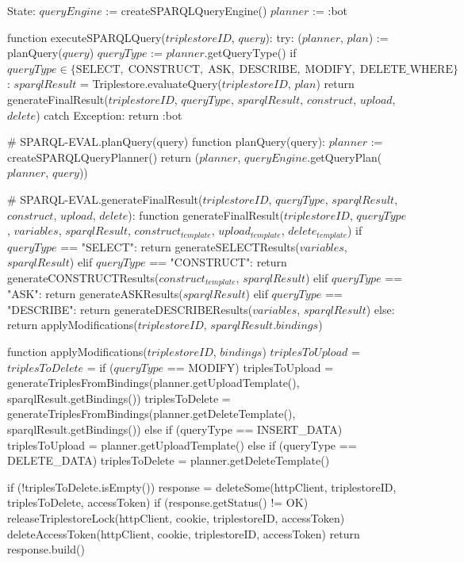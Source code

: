 State:
    $queryEngine$ := createSPARQLQueryEngine()
    $planner$ := :bot

function executeSPARQLQuery($triplestoreID$, $query$):
    try:
        ($planner$, $plan$) := planQuery($query$) 
        $queryType$ := $planner$.getQueryType()
        if $queryType \in \{ \textrm{SELECT}, \; \textrm{CONSTRUCT}, \; \textrm{ASK}, \; \textrm{DESCRIBE}, \; \textrm{MODIFY}, \; \textrm{DELETE_WHERE} \}$:
            $sparqlResult$ = Triplestore.evaluateQuery($triplestoreID$, $plan$)
        return generateFinalResult($triplestoreID$, $queryType$, $sparqlResult$, $construct$, $upload$, $delete$)
    catch Exception:
        return :bot

# SPARQL-EVAL.planQuery(query)
function planQuery(query):
    $planner$ := createSPARQLQueryPlanner()
    return ($planner$, $queryEngine$.getQueryPlan($planner$, $query$))


# SPARQL-EVAL.generateFinalResult($triplestoreID$, $queryType$, $sparqlResult$, $construct$, $upload$, $delete$):
function generateFinalResult($triplestoreID$, $queryType$, $variables$, $sparqlResult$, $construct_{template}$, $upload_{template}$, $delete_{template}$)
    if $queryType$ == "SELECT":
        return generateSELECTResults($variables$, $sparqlResult$)
    elif $queryType$ == "CONSTRUCT":
        return generateCONSTRUCTResults($construct_{template}$, $sparqlResult$)
    elif $queryType$ == "ASK":
        return generateASKResults($sparqlResult$)
    elif $queryType$ == "DESCRIBE":
        return generateDESCRIBEResults($variables$, $sparqlResult$)
    else:
        return applyModifications($triplestoreID$, $sparqlResult$.$bindings$)
    

function applyModifications($triplestoreID$, $bindings$) 
    $triplesToUpload$ = {}
    $triplesToDelete$ = {}
    if ($queryType$ == MODIFY)
        triplesToUpload = generateTriplesFromBindings(planner.getUploadTemplate(), sparqlResult.getBindings())
    triplesToDelete = generateTriplesFromBindings(planner.getDeleteTemplate(), sparqlResult.getBindings())
    else if (queryType == INSERT_DATA)
        triplesToUpload = planner.getUploadTemplate()
    else if (queryType == DELETE_DATA)
        triplesToDelete = planner.getDeleteTemplate()

    if (!triplesToDelete.isEmpty()) 
        response = deleteSome(httpClient, triplestoreID, triplesToDelete, accessToken)
        if (response.getStatus() != OK) 
            releaseTriplestoreLock(httpClient, cookie, triplestoreID, accessToken)
            deleteAccessToken(httpClient, cookie, triplestoreID, accessToken)
            return response.build()
        

